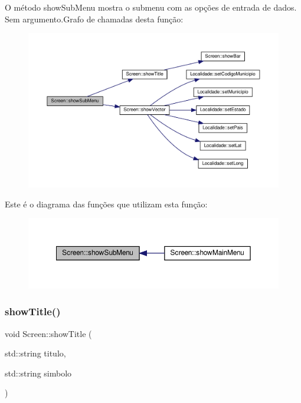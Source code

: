 O método show\+Sub\+Menu mostra o submenu com as opções de entrada de dados.~\newline
Sem argumento.Grafo de chamadas desta função\+:\nopagebreak
\begin{figure}[H]
\begin{center}
\leavevmode
\includegraphics[width=350pt]{classScreen_ac974e1d0dc9ab1f4c9be2d8f70d763c7_cgraph}
\end{center}
\end{figure}
Este é o diagrama das funções que utilizam esta função\+:\nopagebreak
\begin{figure}[H]
\begin{center}
\leavevmode
\includegraphics[width=350pt]{classScreen_ac974e1d0dc9ab1f4c9be2d8f70d763c7_icgraph}
\end{center}
\end{figure}
\mbox{\label{classScreen_aefbd91aee5978143823031767159caf7}} 
\subsubsection{\texorpdfstring{show\+Title()}{showTitle()}}
{\footnotesize\ttfamily void Screen\+::show\+Title (\begin{DoxyParamCaption}\item[{std\+::string}]{titulo,  }\item[{std\+::string}]{simbolo }\end{DoxyParamCaption})}

